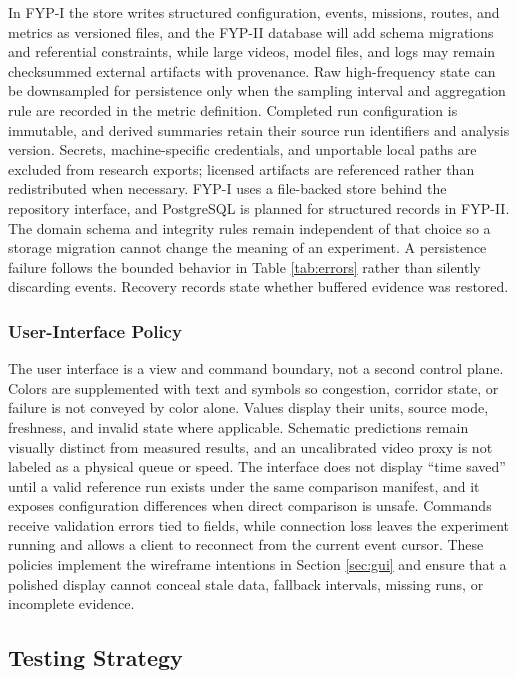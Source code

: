 In FYP-I the store writes structured configuration, events, missions, routes, and metrics as versioned files, and the FYP-II database will add schema migrations and referential constraints, while large videos, model files, and logs may remain checksummed external artifacts with provenance. Raw high-frequency state can be downsampled for persistence only when the sampling interval and aggregation rule are recorded in the metric definition. Completed run configuration is immutable, and derived summaries retain their source run identifiers and analysis version. Secrets, machine-specific credentials, and unportable local paths are excluded from research exports; licensed artifacts are referenced rather than redistributed when necessary. FYP-I uses a file-backed store behind the repository interface, and PostgreSQL is planned for structured records in FYP-II. The domain schema and integrity rules remain independent of that choice so a storage migration cannot change the meaning of an experiment. A persistence failure follows the bounded behavior in Table \ref{tab:errors} rather than silently discarding events. Recovery records state whether buffered evidence was restored.

\subsubsection{User-Interface Policy}

The user interface is a view and command boundary, not a second control plane. Colors are supplemented with text and symbols so congestion, corridor state, or failure is not conveyed by color alone. Values display their units, source mode, freshness, and invalid state where applicable. Schematic predictions remain visually distinct from measured results, and an uncalibrated video proxy is not labeled as a physical queue or speed. The interface does not display ``time saved'' until a valid reference run exists under the same comparison manifest, and it exposes configuration differences when direct comparison is unsafe. Commands receive validation errors tied to fields, while connection loss leaves the experiment running and allows a client to reconnect from the current event cursor. These policies implement the wireframe intentions in Section \ref{sec:gui} and ensure that a polished display cannot conceal stale data, fallback intervals, missing runs, or incomplete evidence.

\subsection{Testing Strategy}

